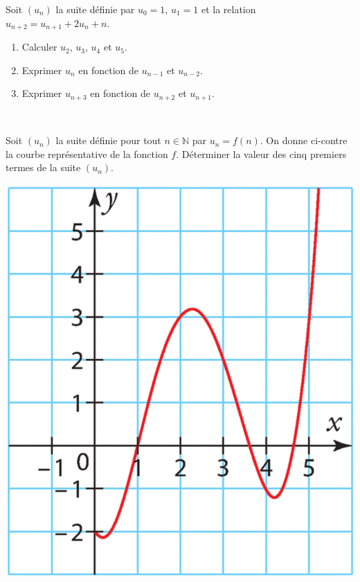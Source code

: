 \documentclass[11pt]{article}
\begin{document}
\begin{exo}
  Soit $(u_n)$ la suite définie par $u_0 = 1$, $u_1 = 1$ et la relation $u_{n+2}
  = u_{n+1} + 2u_n + n$.
\begin{enumerate}
    \item Calculer $u_2$, $u_3$, $u_4$ et $u_5$.
    \item Exprimer $u_n$ en fonction de $u_{n-1}$ et $u_{n-2}$.
    \item Exprimer $u_{n+3}$ en fonction de $u_{n+2}$ et $u_{n+1}$.
\end{enumerate}
\end{exo}

\begin{exo}~\\[-25mm]
  \begin{minipage}[]{.6\textwidth}
    Soit $(u_n)$ la suite définie pour tout $n \in \mathbb{N}$ par $u_n = f(n)$.
    On donne ci-contre la courbe représentative de la fonction $f$. Déterminer
    la valeur des cinq premiers termes de la suite $(u_n)$.
  \end{minipage}
  \begin{minipage}[]{.4\textwidth}
    \includegraphics[scale=.2]{courbe1.png}
  \end{minipage}
\end{exo}
\end{document}
